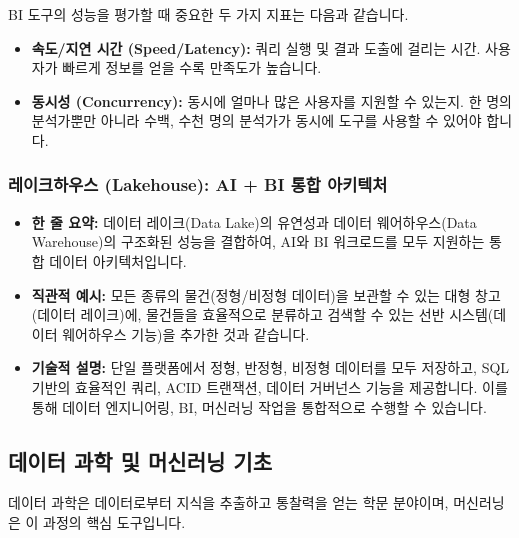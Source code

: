 \documentclass[11pt,a4paper]{article}
\begin{document}
\begin{tcolorbox}[summarybox={BI 도구의 주요 성과 지표 (KPIs)}]
BI 도구의 성능을 평가할 때 중요한 두 가지 지표는 다음과 같습니다.
\begin{itemize}
    \item \textbf{속도/지연 시간 (Speed/Latency):} 쿼리 실행 및 결과 도출에 걸리는 시간. 사용자가 빠르게 정보를 얻을 수록 만족도가 높습니다.
    \item \textbf{동시성 (Concurrency):} 동시에 얼마나 많은 사용자를 지원할 수 있는지. 한 명의 분석가뿐만 아니라 수백, 수천 명의 분석가가 동시에 도구를 사용할 수 있어야 합니다.
\end{itemize}
\end{tcolorbox}

\subsubsection*{레이크하우스 (Lakehouse): AI + BI 통합 아키텍처}
\begin{itemize}
    \item \textbf{한 줄 요약:} 데이터 레이크(Data Lake)의 유연성과 데이터 웨어하우스(Data Warehouse)의 구조화된 성능을 결합하여, AI와 BI 워크로드를 모두 지원하는 통합 데이터 아키텍처입니다.
    \item \textbf{직관적 예시:} 모든 종류의 물건(정형/비정형 데이터)을 보관할 수 있는 대형 창고(데이터 레이크)에, 물건들을 효율적으로 분류하고 검색할 수 있는 선반 시스템(데이터 웨어하우스 기능)을 추가한 것과 같습니다.
    \item \textbf{기술적 설명:} 단일 플랫폼에서 정형, 반정형, 비정형 데이터를 모두 저장하고, SQL 기반의 효율적인 쿼리, ACID 트랜잭션, 데이터 거버넌스 기능을 제공합니다. 이를 통해 데이터 엔지니어링, BI, 머신러닝 작업을 통합적으로 수행할 수 있습니다.
\end{itemize}

\subsection*{데이터 과학 및 머신러닝 기초}
데이터 과학은 데이터로부터 지식을 추출하고 통찰력을 얻는 학문 분야이며, 머신러닝은 이 과정의 핵심 도구입니다.
\end{document}
